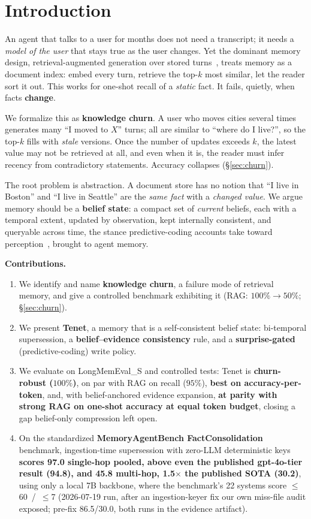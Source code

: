 \documentclass[11pt]{article}
\begin{document}
\section{Introduction}
An agent that talks to a user for months does not need a transcript; it needs a
\emph{model of the user} that stays true as the user changes. Yet the dominant memory
design, retrieval-augmented generation over stored turns~\cite{mem0,longmemeval}, treats
memory as a document index: embed every turn, retrieve the top-$k$ most similar, let the
reader sort it out. This works for one-shot recall of a \emph{static} fact. It fails,
quietly, when facts \textbf{change}.

We formalize this as \textbf{knowledge churn}. A user who moves cities several times
generates many ``I moved to $X$'' turns; all are similar to ``where do I live?'', so the
top-$k$ fills with \emph{stale} versions. Once the number of updates exceeds $k$, the latest
value may not be retrieved at all, and even when it is, the reader must infer recency from
contradictory statements. Accuracy collapses (\S\ref{sec:churn}).

The root problem is abstraction. A document store has no notion that ``I live in Boston''
and ``I live in Seattle'' are the \emph{same fact} with a \emph{changed value}. We argue
memory should be a \textbf{belief state}: a compact set of \emph{current} beliefs, each with
a temporal extent, updated by observation, kept internally consistent, and queryable across
time, the stance predictive-coding accounts take toward
perception~\cite{friston}, brought to agent memory.

\textbf{Contributions.}
\begin{enumerate}\itemsep2pt
\item We identify and name \textbf{knowledge churn}, a failure mode of retrieval memory, and
give a controlled benchmark exhibiting it (RAG: $100\%\!\to\!50\%$; \S\ref{sec:churn}).
\item We present \textbf{Tenet}, a memory that is a self-consistent belief state:
bi-temporal supersession, a \textbf{belief--evidence consistency} rule, and a
\textbf{surprise-gated} (predictive-coding) write policy.
\item We evaluate on LongMemEval\_S and controlled tests: Tenet is \textbf{churn-robust
($100\%$)}, on par with RAG on recall ($95\%$), \textbf{best on accuracy-per-token}, and, with
belief-anchored evidence expansion, \textbf{at parity with strong RAG on one-shot accuracy at
equal token budget}, closing a gap belief-only compression left open.
\item On the standardized \textbf{MemoryAgentBench FactConsolidation} benchmark,
ingestion-time supersession with zero-LLM deterministic keys \textbf{scores 97.0 single-hop
pooled, above even the published gpt-4o-tier result (94.8), and 45.8 multi-hop, 1.5$\times$
the published SOTA (30.2)}, using only a local 7B backbone, where the benchmark's 22
systems score $\le$60~/~$\le$7 (2026-07-19 run, after an ingestion-keyer fix our own
miss-file audit exposed; pre-fix 86.5/30.0, both runs in the evidence artifact).
\end{enumerate}
\end{document}
